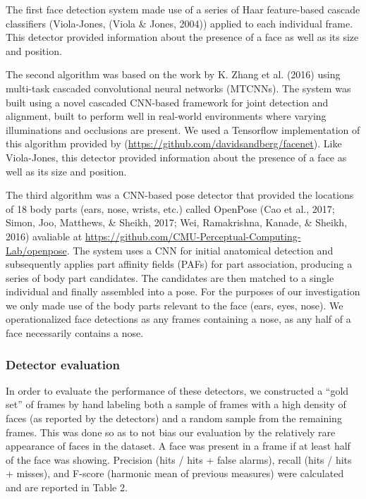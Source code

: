 \documentclass[10pt, letterpaper]{article}
\begin{document}
The first face detection system made use of a series of Haar
feature-based cascade classifiers (Viola-Jones, (Viola \& Jones, 2004))
applied to each individual frame. This detector provided information
about the presence of a face as well as its size and position.

The second algorithm was based on the work by K. Zhang et al. (2016)
using multi-task cascaded convolutional neural networks (MTCNNs). The
system was built using a novel cascaded CNN-based framework for joint
detection and alignment, built to perform well in real-world
environments where varying illuminations and occlusions are present. We
used a Tensorflow implementation of this algorithm provided by
(\url{https://github.com/davidsandberg/facenet}). Like Viola-Jones, this
detector provided information about the presence of a face as well as
its size and position.

The third algorithm was a CNN-based pose detector that provided the
locations of 18 body parts (ears, nose, wrists, etc.) called OpenPose
(Cao et al., 2017; Simon, Joo, Matthews, \& Sheikh, 2017; Wei,
Ramakrishna, Kanade, \& Sheikh, 2016) avaliable at
\url{https://github.com/CMU-Perceptual-Computing-Lab/openpose}. The
system uses a CNN for initial anatomical detection and subsequently
applies part affinity fields (PAFs) for part association, producing a
series of body part candidates. The candidates are then matched to a
single individual and finally assembled into a pose. For the purposes of
our investigation we only made use of the body parts relevant to the
face (ears, eyes, nose). We operationalized face detections as any
frames containing a nose, as any half of a face necessarily contains a
nose.\\

\subsubsection{Detector evaluation}\label{detector-evaluation}

In order to evaluate the performance of these detectors, we constructed
a ``gold set'' of frames by hand labeling both a sample of frames with a
high density of faces (as reported by the detectors) and a random sample
from the remaining frames. This was done so as to not bias our
evaluation by the relatively rare appearance of faces in the dataset. A
face was present in a frame if at least half of the face was showing.
Precision (hits / hits + false alarms), recall (hits / hits + misses),
and F-score (harmonic mean of previous measures) were calculated and are
reported in Table 2.
\end{document}
